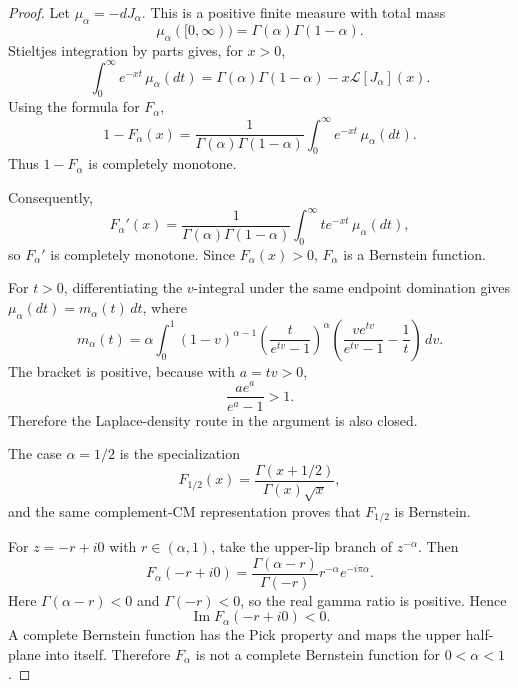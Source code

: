 \begin{proof}
Let \(\mu_\alpha=-dJ_\alpha\). This is a positive finite measure with total mass
\[
\mu_\alpha([0,\infty))=\Gamma(\alpha)\Gamma(1-\alpha).
\]
Stieltjes integration by parts gives, for \(x>0\),
\[
\int_0^\infty e^{-xt}\,\mu_\alpha(dt)
=
\Gamma(\alpha)\Gamma(1-\alpha)-x\mathcal L[J_\alpha](x).
\]
Using the formula for \(F_\alpha\),
\[
1-F_\alpha(x)
=
\frac{1}{\Gamma(\alpha)\Gamma(1-\alpha)}
\int_0^\infty e^{-xt}\,\mu_\alpha(dt).
\]
Thus \(1-F_\alpha\) is completely monotone.

Consequently,
\[
F_\alpha'(x)
=
\frac{1}{\Gamma(\alpha)\Gamma(1-\alpha)}
\int_0^\infty t e^{-xt}\,\mu_\alpha(dt),
\]
so \(F_\alpha'\) is completely monotone. Since \(F_\alpha(x)>0\), \(F_\alpha\) is a Bernstein function.

For \(t>0\), differentiating the \(v\)-integral under the same endpoint domination gives \(\mu_\alpha(dt)=m_\alpha(t)\,dt\), where
\[
m_\alpha(t)
=
\alpha\int_0^1
(1-v)^{\alpha-1}
\left(\frac{t}{e^{tv}-1}\right)^\alpha
\left(
\frac{v e^{tv}}{e^{tv}-1}-\frac1t
\right)\,dv.
\]
The bracket is positive, because with \(a=tv>0\),
\[
\frac{a e^a}{e^a-1}>1.
\]
Therefore the Laplace-density route in the argument is also closed.

The case \(\alpha=1/2\) is the specialization
\[
F_{1/2}(x)=\frac{\Gamma(x+1/2)}{\Gamma(x)\sqrt{x}},
\]
and the same complement-CM representation proves that \(F_{1/2}\) is Bernstein.

For \(z=-r+i0\) with \(r\in(\alpha,1)\), take the upper-lip branch of \(z^{-\alpha}\). Then
\[
F_\alpha(-r+i0)
=
\frac{\Gamma(\alpha-r)}{\Gamma(-r)}r^{-\alpha}e^{-i\pi\alpha}.
\]
Here \(\Gamma(\alpha-r)<0\) and \(\Gamma(-r)<0\), so the real gamma ratio is positive. Hence
\[
\operatorname{Im} F_\alpha(-r+i0)<0.
\]
A complete Bernstein function has the Pick property and maps the upper half-plane into itself. Therefore \(F_\alpha\) is not a complete Bernstein function for \(0<\alpha<1\).
\end{proof}

